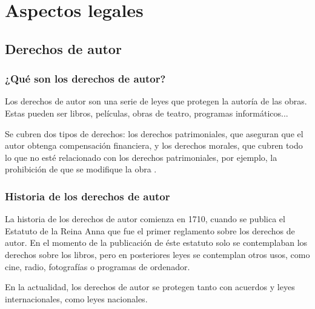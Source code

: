 
\chapter{Aspectos legales} %
\label{cha:AspectosLegales}

    \section{Derechos de autor} %
    \label{sec:DerechosDeAutor}
        \subsection{¿Qué son los derechos de autor?} %
        \label{sub:QueSonLosDerechosDeAutor}

            Los derechos de autor son una serie de leyes que protegen la autoría de las obras. Estas pueden ser libros,
            películas, obras de teatro, programas informáticos...

            Se cubren dos tipos de derechos: los derechos patrimoniales, que aseguran que el autor obtenga compensación
            financiera, y los derechos morales, que cubren todo lo que no esté relacionado con los derechos
            patrimoniales, por ejemplo, la prohibición de que se modifique la obra \cite{derechos_ompi}.


        \subsection{Historia de los derechos de autor} %
        \label{sub:HistoriaDeLosDerechosDeAutor}

            La historia de los derechos de autor comienza en 1710, cuando se publica el Estatuto de la Reina
            Anna \cite{estatuto_anna} que fue el primer reglamento sobre los derechos de autor. En el momento de la
            publicación de éste estatuto solo se contemplaban los derechos sobre los libros, pero en posteriores leyes
            se contemplan otros usos, como cine, radio, fotografías o programas de ordenador.

            En la actualidad, los derechos de autor se protegen tanto con acuerdos y leyes internacionales, como leyes
            nacionales.


